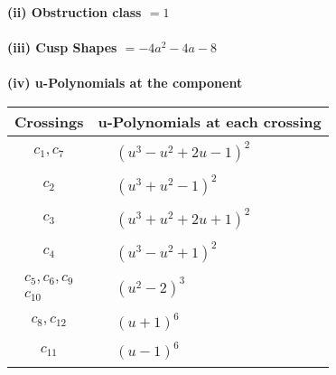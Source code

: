 \documentclass[1p]{elsarticle_modified}
\theoremstyle{definition}
\begin{document}
\flushleft \textbf{(ii) Obstruction class $= 1$}\\~\\
\flushleft \textbf{(iii) Cusp Shapes $= -4 a^2-4 a-8$}\\~\\
\newpage\renewcommand{\arraystretch}{1}
\flushleft \textbf{(iv) u-Polynomials at the component}\newline \\
\begin{tabular}{m{50pt}|m{274pt}}
Crossings & \hspace{64pt}u-Polynomials at each crossing \\
\hline $$\begin{aligned}c_{1},c_{7}\end{aligned}$$&$\begin{aligned}
&(u^3- u^2+2 u-1)^2
\end{aligned}$\\
\hline $$\begin{aligned}c_{2}\end{aligned}$$&$\begin{aligned}
&(u^3+u^2-1)^2
\end{aligned}$\\
\hline $$\begin{aligned}c_{3}\end{aligned}$$&$\begin{aligned}
&(u^3+u^2+2 u+1)^2
\end{aligned}$\\
\hline $$\begin{aligned}c_{4}\end{aligned}$$&$\begin{aligned}
&(u^3- u^2+1)^2
\end{aligned}$\\
\hline $$\begin{aligned}c_{5},c_{6},c_{9}\\c_{10}\end{aligned}$$&$\begin{aligned}
&(u^2-2)^3
\end{aligned}$\\
\hline $$\begin{aligned}c_{8},c_{12}\end{aligned}$$&$\begin{aligned}
&(u+1)^6
\end{aligned}$\\
\hline $$\begin{aligned}c_{11}\end{aligned}$$&$\begin{aligned}
&(u-1)^6
\end{aligned}$\\
\hline
\end{tabular}\\~\\
\end{document}
